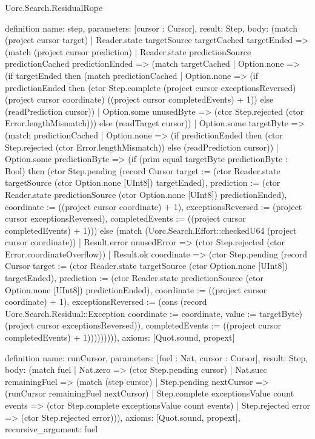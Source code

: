\begin{lexlean}{Uorc.Search.ResidualRope}
\begin{semanticmodule}
definition{
  name: step,
  parameters: [cursor : Cursor],
  result: Step,
  body: (match (project cursor target)
    | Reader.state targetSource targetCached targetEnded => (match (project cursor prediction)
      | Reader.state predictionSource predictionCached predictionEnded => (match targetCached
        | Option.none => (if targetEnded then (match predictionCached
          | Option.none => (if predictionEnded then (ctor Step.complete (project cursor exceptionsReversed) (project cursor coordinate) ((project cursor completedEvents) + 1)) else (readPrediction cursor))
          | Option.some unusedByte => (ctor Step.rejected (ctor Error.lengthMismatch))) else (readTarget cursor))
        | Option.some targetByte => (match predictionCached
          | Option.none => (if predictionEnded then (ctor Step.rejected (ctor Error.lengthMismatch)) else (readPrediction cursor))
          | Option.some predictionByte => (if (prim equal targetByte predictionByte : Bool) then (ctor Step.pending (record Cursor {target := (ctor Reader.state targetSource (ctor Option.none [UInt8]) targetEnded), prediction := (ctor Reader.state predictionSource (ctor Option.none [UInt8]) predictionEnded), coordinate := ((project cursor coordinate) + 1), exceptionsReversed := (project cursor exceptionsReversed), completedEvents := ((project cursor completedEvents) + 1)})) else (match (Uorc.Search.Effort::checkedU64 (project cursor coordinate))
            | Result.error unusedError => (ctor Step.rejected (ctor Error.coordinateOverflow))
            | Result.ok coordinate => (ctor Step.pending (record Cursor {target := (ctor Reader.state targetSource (ctor Option.none [UInt8]) targetEnded), prediction := (ctor Reader.state predictionSource (ctor Option.none [UInt8]) predictionEnded), coordinate := ((project cursor coordinate) + 1), exceptionsReversed := (cons (record Uorc.Search.Residual::Exception {coordinate := coordinate, value := targetByte}) (project cursor exceptionsReversed)), completedEvents := ((project cursor completedEvents) + 1)})))))))),
  axioms: [Quot.sound, propext]
}

definition{
  name: runCursor,
  parameters: [fuel : Nat, cursor : Cursor],
  result: Step,
  body: (match fuel
    | Nat.zero => (ctor Step.pending cursor)
    | Nat.succ remainingFuel => (match (step cursor)
      | Step.pending nextCursor => (runCursor remainingFuel nextCursor)
      | Step.complete exceptionsValue count events => (ctor Step.complete exceptionsValue count events)
      | Step.rejected error => (ctor Step.rejected error))),
  axioms: [Quot.sound, propext],
  recursive_argument: fuel
}


\end{semanticmodule}
\end{lexlean}
